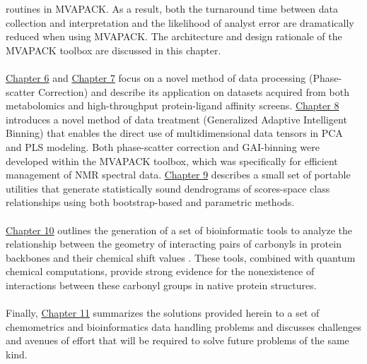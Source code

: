 \begin{doublespace}
routines in MVAPACK. As a result, both the turnaround time between data
collection and interpretation and the likelihood of analyst error are
dramatically reduced when using MVAPACK. The architecture and design rationale
of the MVAPACK toolbox are discussed in this chapter.
\\\\
\hyperlink{chapter.6}{Chapter 6} and \hyperlink{chapter.7}{Chapter 7} focus on
a novel method of data processing (Phase-scatter Correction) and describe its
application on datasets acquired from both metabolomics and high-throughput
protein-ligand affinity screens. \hyperlink{chapter.8}{Chapter 8} introduces
a novel method of data treatment (Generalized Adaptive Intelligent Binning)
that enables the direct use of multidimensional data tensors in PCA and PLS
modeling. Both phase-scatter correction and GAI-binning were developed within
the MVAPACK toolbox, which was specifically for efficient management of NMR
spectral data. \hyperlink{chapter.9}{Chapter 9} describes a small set of
portable utilities that generate statistically sound dendrograms of
scores-space class relationships using both bootstrap-based and parametric
methods.
\\\\
\hyperlink{chapter.10}{Chapter 10} outlines the generation of a set of
bioinformatic tools to analyze the relationship between the geometry of
interacting pairs of carbonyls in protein backbones and their \cnmr{} chemical
shift values \cite{worley:pone2012}. These tools, combined with quantum
chemical computations, provide strong evidence for the nonexistence of
\npistar{} interactions between these carbonyl groups in native protein
structures.
\\\\
Finally, \hyperlink{chapter.11}{Chapter 11} summarizes the solutions provided
herein to a set of chemometrics and bioinformatics data handling problems and
discusses challenges and avenues of effort that will be required to solve
future problems of the same kind.
\end{doublespace}




